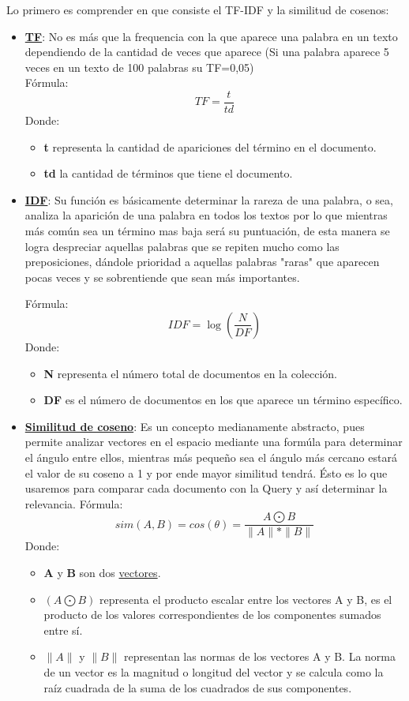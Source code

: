 \documentclass[12pt, Letterpaper]{article}
\begin{document}
Lo primero es comprender en que consiste el TF-IDF y la similitud de cosenos:
\begin{itemize}
    \item \textbf{\underline{TF}}: No es más que la frequencia con la que aparece una palabra en un texto dependiendo
     de la cantidad de veces que aparece (Si una palabra aparece 5 veces en un texto de 100 palabras su TF=0,05)\\
        Fórmula: \[TF=\frac{t}{td} \]
        Donde:
        \begin{itemize}
        \item \textbf{t} representa la cantidad de apariciones del término en el documento. 
        \item \textbf{td} la cantidad de términos que tiene el documento.
        \end{itemize} 
        \item \textbf{\underline{IDF}}: Su función es básicamente determinar la rareza de una palabra, o sea, 
        analiza la aparición de una palabra en todos los textos por lo que mientras más común sea un término mas baja
        será su puntuación, de esta manera se logra despreciar aquellas palabras que se repiten mucho como las 
        preposiciones, dándole prioridad a aquellas palabras "raras" que aparecen pocas veces y se sobrentiende que 
        sean más importantes.
        
        Fórmula: \[IDF=\log (\frac{N}{DF}) \] 
        Donde:
        \begin{itemize}
            \item \textbf{N} representa el número total de documentos en la colección.
            \item \textbf{DF} es el número de documentos en los que aparece un término específico.
        \end{itemize}
          
        \item \textbf{\underline{Similitud de coseno}}: Es un concepto medianamente abstracto, pues permite analizar 
        vectores en el espacio mediante una formúla para determinar el ángulo entre ellos, mientras más pequeño sea el
        ángulo más cercano estará el valor de su coseno a 1 y por ende mayor similitud tendrá. Ésto es lo que usaremos
        para comparar cada documento con la Query y así determinar la relevancia.
        Fórmula: \[sim(A,B)=cos(\theta )=\frac{A\bigodot B}{\| A \| * \| B \|} \] 
        Donde:
        \begin{itemize}
            \item \textbf{A} y \textbf{B} son dos \underline{vectores}.
            \item $(A\bigodot B)$ representa el producto escalar entre los vectores A y B, es el producto de los  
            valores correspondientes de los componentes sumados entre sí.
            \item $\| A \|$ y $\| B\|$ representan las normas de los vectores A y B. La norma de un vector es la 
            magnitud o longitud del vector y se calcula como la raíz cuadrada de la suma de los cuadrados de sus 
            componentes.\\


\end{itemize}
\end{itemize}
\end{document}
